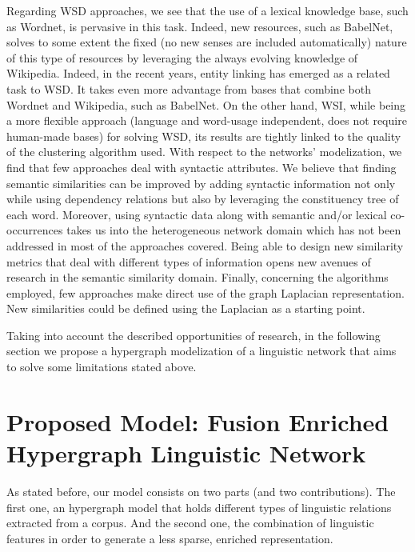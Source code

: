 Regarding WSD approaches, we see that the use of a lexical knowledge base, such as Wordnet, is pervasive in this task. Indeed, new resources, such as BabelNet, solves to some extent the fixed (no new senses are included automatically) nature of this type of resources by leveraging the always evolving knowledge of Wikipedia. Indeed, in the recent years, entity linking has emerged as a related task to WSD. It takes even more advantage from bases that combine both Wordnet and Wikipedia, such as BabelNet. On the other hand, WSI, while being a more flexible approach (language and word-usage independent, does not require human-made bases)  for solving WSD, its results are tightly linked to the quality of the clustering algorithm used. 
% 
 With respect to the networks' modelization, we find that few approaches deal with syntactic attributes. We believe that finding semantic similarities can be improved by adding syntactic information not only  while using dependency relations but also by leveraging the constituency tree of each word. Moreover, using syntactic data along with semantic and/or lexical co-occurrences takes us into the heterogeneous network domain which has not been addressed in most of the approaches covered. Being able to design new similarity metrics that deal with different types of information opens new avenues of research in the semantic similarity domain. Finally, concerning the algorithms employed, few approaches make direct use of the graph Laplacian representation. New similarities could be defined using the Laplacian as a starting point. 


Taking into account the described opportunities of research, in the following section we propose a  hypergraph modelization of a linguistic network that aims to solve some limitations stated above. 


 
\section{Proposed Model: Fusion Enriched Hypergraph Linguistic Network}

As stated before, our model consists on two parts (and two contributions). The first one, an hypergraph model that holds different types of linguistic relations extracted from a corpus. And the second one, the combination of linguistic features in order to generate a less sparse, enriched representation. 

